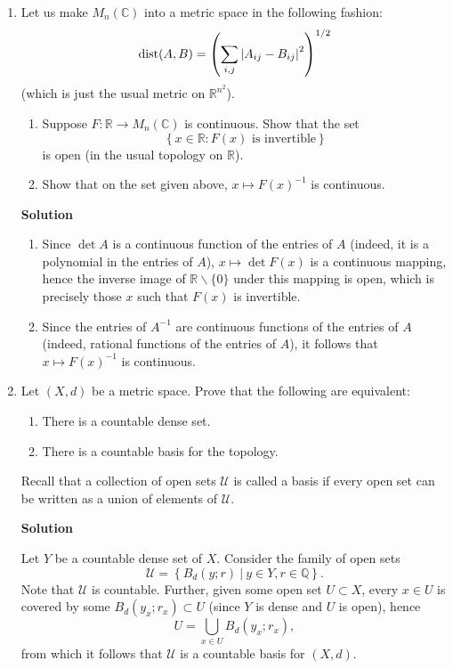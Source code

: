 \documentclass{article}
\def\dist{\mathop{\rm dist}\nolimits}
\begin{document}
\begin{enumerate}
\item Let us make \(M_n(\mathbb{C})\) into a metric space in the following fashion:
\[\dist(A,B) = \left( \sum_{i,j} \left| A_{ij} - B_{ij} \right|^2 \right)^{1/2}\]
(which is just the usual metric on \(\mathbb{R}^{n^2}\)).

\begin{enumerate}
\item Suppose \(F : \mathbb{R} \to M_n(\mathbb{C})\) is continuous.  Show that the set
\[\left\{ x \in \mathbb{R} : F(x) \text{ is invertible} \right\}\]
is open (in the usual topology on \(\mathbb{R}\)).

\item Show that on the set given above, \(x \mapsto F(x)^{-1}\) is continuous.

\end{enumerate}

{\bf Solution}

\begin{enumerate}
\item Since \(\det A\) is a continuous function of the entries of \(A\) (indeed, it is a polynomial in the entries of \(A\)), \(x \mapsto \det F(x)\) is a continuous mapping, hence the inverse image of \(\mathbb{R} \backslash \{0\}\) under this mapping is open, which is precisely those \(x\) such that \(F(x)\) is invertible.

\item Since the entries of \(A^{-1}\) are continuous functions of the entries of \(A\) (indeed, rational functions of the entries of \(A\)), it follows that \(x \mapsto F(x)^{-1}\) is continuous.

\end{enumerate}



\item Let \((X,d)\) be a metric space.  Prove that the following are equivalent:
\begin{enumerate}
\item There is a countable dense set.
\item There is a countable basis for the topology.
\end{enumerate}
Recall that a collection of open sets \(\mathcal{U}\) is called a basis if every open set can be written as a union of elements of \(\mathcal{U}\).

{\bf Solution}

Let \(Y\) be a countable dense set of \(X\).  Consider the family of open sets
\[\mathcal{U} = \left\{ B_d(y;r) \ | \ y \in Y, r \in \mathbb{Q} \right\}.\]
Note that \(\mathcal{U}\) is countable.  Further, given some open set \(U \subset X\), every \(x \in U\) is covered by some \(B_d(y_x;r_x) \subset U\) (since \(Y\) is dense and \(U\) is open), hence
\[U = \bigcup_{x \in U} B_d(y_x;r_x),\]
from which it follows that \(\mathcal{U}\) is a countable basis for \((X,d)\).


\end{enumerate}
\end{document}
